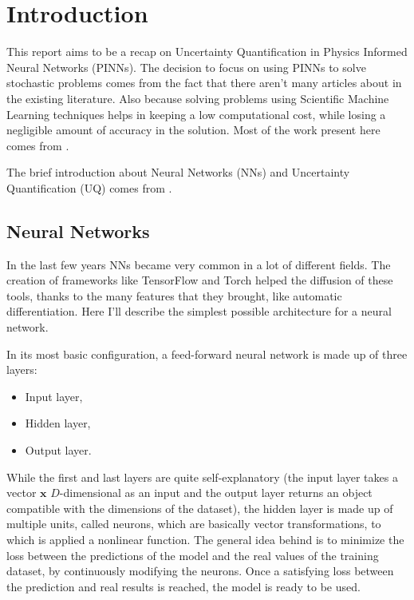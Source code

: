 \documentclass[11pt,a4paper]{article}
\begin{document}



\section{Introduction}

This report aims to be a recap on Uncertainty Quantification in Physics Informed Neural Networks (PINNs). The decision to focus on using PINNs to solve stochastic problems comes from the fact that there aren't many articles about in the existing literature. Also because solving problems using Scientific Machine Learning techniques helps in keeping a low computational cost, while losing a negligible amount of accuracy in the solution. Most of the work present here comes from \cite{Zhang_2019}.

The brief introduction about Neural Networks (NNs) and Uncertainty Quantification (UQ) comes from \cite{Abdar_2021}.
\subsection{Neural Networks}
In the last few years NNs became very common in a lot of different fields. The creation of frameworks like TensorFlow and Torch helped the diffusion of these tools, thanks to the many features that they brought, like automatic differentiation. Here I'll describe the simplest possible architecture for a neural network. 

In its most basic configuration, a feed-forward neural network is made up of three layers:
\begin{itemize}
    \item Input layer,
    \item Hidden layer,
    \item Output layer.
\end{itemize}
While the first and last layers are quite self-explanatory (the input layer takes a vector \(\bm{x}\) \(D\)-dimensional as an input and the output layer returns an object compatible with the dimensions of the dataset), the hidden layer is made up of multiple units, called neurons, which are basically vector transformations, to which is applied a nonlinear function. The general idea behind is to minimize the loss between the predictions of the model and the real values of the training dataset, by continuously modifying the neurons. Once a satisfying loss between the prediction and real results is reached, the model is ready to be used. 
\end{document}
